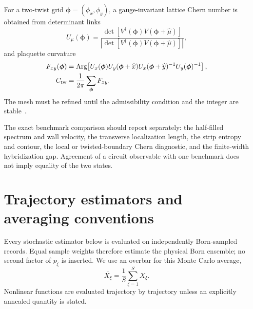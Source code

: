 For a two-twist grid \(\boldsymbol\phi=(\phi_x,\phi_y)\), a gauge-invariant
lattice Chern number is obtained from determinant links
\begin{equation}
    U_\mu(\boldsymbol\phi)
    =\frac{\det[V^\dagger(\boldsymbol\phi)
      V(\boldsymbol\phi+\widehat\mu)]}
    {|\det[V^\dagger(\boldsymbol\phi)
      V(\boldsymbol\phi+\widehat\mu)]|},
    \label{eq:app-FHS-link}
\end{equation}
and plaquette curvature
\begin{align}
    F_{xy}(\boldsymbol\phi)
    &=\operatorname{Arg}\!\left[
      U_x(\boldsymbol\phi)
      U_y(\boldsymbol\phi+\widehat x)
      U_x(\boldsymbol\phi+\widehat y)^{-1}
      U_y(\boldsymbol\phi)^{-1}\right],\nonumber\\
    C_{\rm tw}&=\frac{1}{2\pi}\sum_{\boldsymbol\phi}F_{xy}.
    \label{eq:app-twist-Chern-number}
\end{align}
The mesh must be refined until the admissibility condition and the integer
are stable~\cite{FukuiHatsugaiSuzuki2005}.

The exact benchmark comparison should report separately: the half-filled
spectrum and wall velocity, the transverse localization length, the strip
entropy and contour, the local or twisted-boundary Chern diagnostic, and the
finite-width hybridization gap.  Agreement of a circuit observable with one
benchmark does not imply equality of the two states.



\section{Trajectory estimators and averaging conventions}
\label{app:estimators}

Every stochastic estimator below is evaluated on independently Born-sampled
records.  Equal sample weights therefore estimate the physical Born ensemble;
no second factor of \(p_\xi\) is inserted.  We use an overbar for this Monte
Carlo average,
\begin{equation}
    \overline{X_\xi}=\frac{1}{S}\sum_{\xi=1}^{S}X_\xi.
    \label{eq:app-Born-sample-average}
\end{equation}
Nonlinear functions are evaluated trajectory by trajectory unless an
explicitly annealed quantity is stated.

